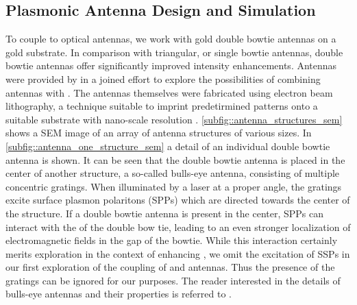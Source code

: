 	\subsection{Plasmonic Antenna Design and Simulation} \label{sec::structure_antenna}

		 To couple \sivs to optical antennas, we work with gold double bowtie antennas on a gold substrate. In comparison with triangular, or single bowtie antennas, double bowtie antennas offer significantly improved intensity enhancements. Antennas were provided by \nancy in a joined effort to explore the possibilities of combining antennas with \sivs. The antennas themselves were fabricated using electron beam lithography, a technique suitable to imprint predetirmined patterns onto a suitable substrate with nano-scale resolution \cite{nancy::232}. \cref{subfig::antenna_structures_sem} shows a SEM image of an array of antenna structures of various sizes. In \cref{subfig::antenna_one_structure_sem} a detail of an individual double bowtie antenna is shown. It can be seen that the double bowtie antenna is placed in the center of another structure, a so-called bulls-eye antenna, consisting of multiple concentric gratings. When illuminated by a laser at a proper angle, the gratings excite surface plasmon polaritons (SPPs) which are directed towards the center of the structure. If a double bowtie antenna is present in the center, SPPs can interact with the \LSPs of the double bow tie, leading to an even stronger localization of electromagnetic fields in the gap of the bowtie. While this interaction certainly merits exploration in the context of enhancing \sivs, we omit the excitation of SSPs in our first exploration of the coupling of \sivs and antennas. Thus the presence of the gratings can be ignored for our purposes. The reader interested in the details of bulls-eye antennas and their properties is referred to \cite{nancy::thesis}.

